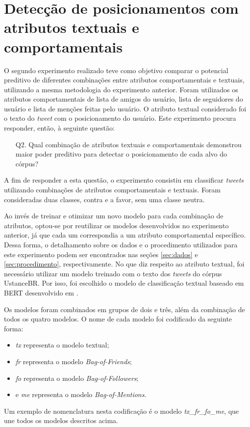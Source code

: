 \documentclass[
	12pt, oneside, a4paper, english, brazil
]{abntex2ppgsi}
\begin{document}
\section{Detecção de posicionamentos com atributos textuais e comportamentais}
\label{sec:deteccao-atributos-textuais-e-comportamentais}

O segundo experimento realizado teve como objetivo comparar o potencial preditivo de diferentes combinações entre atributos comportamentais e textuais, utilizando a mesma metodologia do experimento anterior. Foram utilizados os atributos comportamentais de lista de amigos do usuário, lista de seguidores do usuário e lista de menções feitas pelo usuário. O atributo textual considerado foi o texto do {\em tweet} com o posicionamento do usuário. Este experimento procura responder, então, à seguinte questão:

\begin{itemize}
    \item [Q2.] Qual combinação de atributos textuais e comportamentais demonstrou maior poder preditivo para detectar o posicionamento de cada alvo do córpus?
\end{itemize}

A fim de responder a esta questão, o experimento consistiu em classificar {\em tweets} utilizando combinações de atributos comportamentais e textuais. Foram consideradas duas classes, contra e a favor, sem uma classe neutra.

Ao invés de treinar e otimizar um novo modelo para cada combinação de atributos, optou-se por reutilizar os modelos desenvolvidos no experimento anterior, já que cada um correspondia a um atributo comportamental específico. Dessa forma, o detalhamento sobre os dados e o procedimento utilizados para este experimento podem ser encontrados nas seções \ref{sec:dados} e \ref{sec:procedimento}, respectivamente. No que diz respeito ao atributo textual, foi necessário utilizar um modelo treinado com o texto dos {\em tweets} do córpus UstanceBR. Por isso, foi escolhido o modelo de classificação textual baseado em BERT desenvolvido em .

Os modelos foram combinados em grupos de dois e três, além da combinação de todos os quatro modelos. O nome de cada modelo foi codificado da seguinte forma:
\begin{itemize}
    \item {\em tx} representa o modelo textual;
    \item {\em fr} representa o modelo {\em Bag-of-Friends};
    \item {\em fo} representa o modelo {\em Bag-of-Followers};
    \item e {\em me} representa o modelo {\em Bag-of-Mentions}.
\end{itemize}
Um exemplo de nomenclatura nesta codificação é o modelo {\em tx\_fr\_fo\_me}, que une todos os modelos descritos acima.
\end{document}

